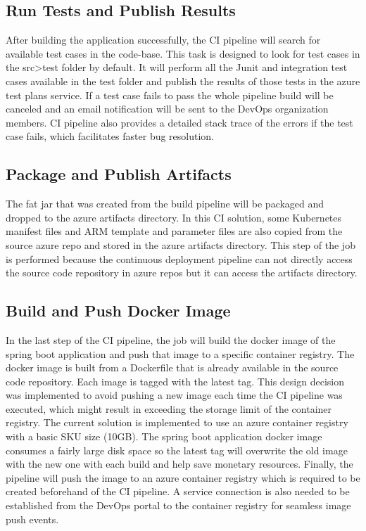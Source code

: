\subsection{Run Tests and Publish Results}
After building the application successfully, the CI pipeline will search for available test cases in the code-base. This task is designed to look for test cases in the src>test folder by default. It will perform all the Junit and integration test cases available in the test folder and publish the results of those tests in the azure test plans service. If a test case fails to pass the whole pipeline build will be canceled and an email notification will be sent to the DevOps organization members. CI pipeline also provides a detailed stack trace of the errors if the test case fails, which facilitates faster bug resolution.

\subsection{Package and Publish Artifacts}
The fat jar that was created from the build pipeline will be packaged and dropped to the azure artifacts directory. In this CI solution, some Kubernetes manifest files and ARM template and parameter files are also copied from the source azure repo and stored in the azure artifacts directory. This step of the job is performed because the continuous deployment pipeline can not directly access the source code repository in azure repos but it can access the artifacts directory.

\subsection{Build and Push Docker Image}
In the last step of the CI pipeline, the job will build the docker image of the spring boot application and push that image to a specific container registry. The docker image is built from a Dockerfile that is already available in the source code repository. Each image is tagged with the latest tag. This design decision was implemented to avoid pushing a new image each time the CI pipeline was executed, which might result in exceeding the storage limit of the container registry. The current solution is implemented to use an azure container registry with a basic SKU size (10GB). The spring boot application docker image consumes a fairly large disk space so the latest tag will overwrite the old image with the new one with each build and help save monetary resources. Finally, the pipeline will push the image to an azure container registry which is required to be created beforehand of the CI pipeline. A service connection is also needed to be established from the DevOps portal to the container registry for seamless image push events.
